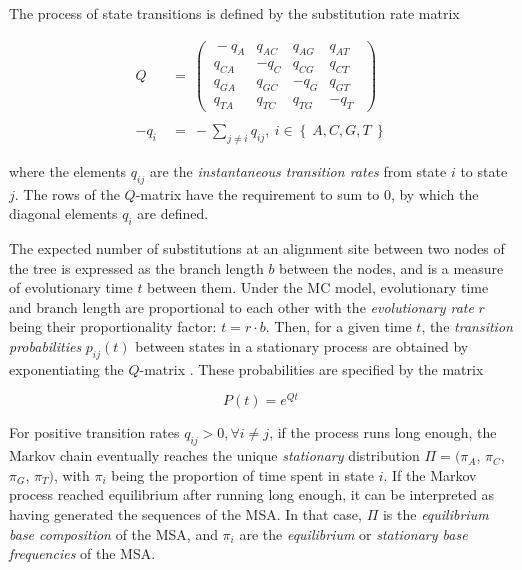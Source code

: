The process of state transitions is defined by the substitution rate matrix %

\begin{equation}
    \begin{align*}
        Q ~&=~
         \begin{pmatrix}
         ~-q_{A}   &   q_{AC}   &   q_{AG}   &   q_{AT}~~ \\
         ~q_{CA}   &  -q_{C}    &   q_{CG}   &   q_{CT}~~ \\
         ~q_{GA}   &   q_{GC}   &  -q_{G}    &   q_{GT}~~ \\
         ~q_{TA}   &   q_{TC}   &   q_{TG}   &  -q_{T}~~
         \end{pmatrix}
        \\ \\
        - q_{i} ~&=~ - \sum_{j \neq i} q_{ij}, ~ i \in \left\{~ A, C, G, T ~\right\}
    \end{align*}
\end{equation}

where the elements $q_{ij}$ are the \emph{instantaneous transition rates} from state $i$ to state $j$.
The rows of the $Q$-matrix have the requirement to sum to $0$,
by which the diagonal elements $q_{i}$ are defined.

The expected number of substitutions at an alignment site between two nodes of the tree
is expressed as the branch length $b$ between the nodes, and is a measure of evolutionary time $t$ between them.
Under the MC model, evolutionary time and branch length are proportional to each other
with the \emph{evolutionary rate} $r$ being their proportionality factor: $t = r \cdot b$.
Then, for a given time $t$, the \emph{transition probabilities} $p_{ij}(t)$ between states in a stationary process
are obtained by exponentiating the $Q$-matrix \cite{Yang2014}.
These probabilities are specified by the matrix

\begin{equation}
    \label{ch:Foundations:sec:MLTreeInference:eq:P_matrix}
    P(t) = e^{Qt}
\end{equation}

For positive transition rates $q_{ij} > 0, \forall i \neq j$, if the process runs long enough,
the Markov chain eventually reaches the unique \emph{stationary} distribution $\Pi = (\pi_A$, $\pi_C$, $\pi_G$, $\pi_T )$,
with $\pi_i$ being the proportion of time spent in state $i$.
If the Markov process reached equilibrium after running long enough,
it can be interpreted as having generated the sequences of the MSA.
In that case, $\Pi$ is the \emph{equilibrium base composition} of the MSA,
and $\pi_i$ are the \emph{equilibrium} or \emph{stationary base frequencies} of the MSA.

